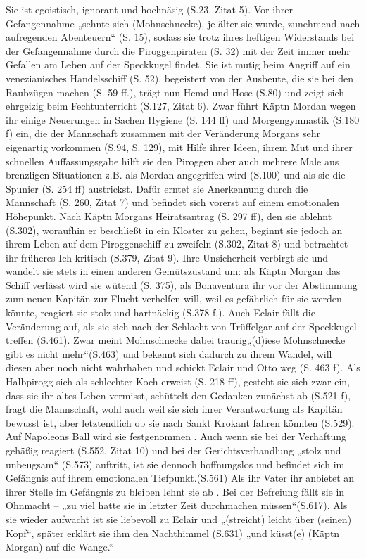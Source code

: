Sie ist egoistisch, ignorant und hochnäsig (S.23, Zitat 5). 
Vor ihrer Gefangennahme „sehnte sich (Mohnschnecke), 
je älter sie wurde, zunehmend nach aufregenden Abenteuern“ (S. 15), sodass sie trotz ihres heftigen Widerstands 
bei der Gefangennahme durch die Piroggenpiraten (S. 32) mit der Zeit immer mehr Gefallen am Leben auf der Speckkugel 
findet. Sie ist mutig beim Angriff auf ein venezianisches Handelsschiff (S. 52),  begeistert von der Ausbeute, die sie 
bei den Raubzügen machen (S. 59 ff.), trägt nun Hemd und Hose (S.80) und zeigt sich ehrgeizig beim Fechtunterricht 
(S.127, Zitat 6). Zwar führt Käptn Mordan wegen ihr einige Neuerungen in Sachen Hygiene (S. 144 ff) und 
Morgengymnastik (S.180 f) ein, die der Mannschaft  zusammen mit der Veränderung Morgans sehr eigenartig 
vorkommen (S.94, S. 129), mit Hilfe ihrer Ideen, ihrem Mut und ihrer schnellen Auffassungsgabe  hilft sie 
den Piroggen aber auch mehrere Male aus brenzligen Situationen z.B. als Mordan angegriffen wird (S.100) und 
als sie die Spunier (S. 254 ff) austrickst. Dafür erntet sie Anerkennung durch die Mannschaft (S. 260, Zitat 7) 
und befindet sich vorerst auf einem emotionalen Höhepunkt.  Nach  Käptn Morgans Heiratsantrag (S. 297 ff), den sie 
ablehnt (S.302), woraufhin er beschließt in ein Kloster zu gehen, beginnt sie jedoch an ihrem Leben auf dem 
Piroggenschiff zu zweifeln (S.302, Zitat 8) und betrachtet ihr früheres Ich kritisch (S.379, Zitat 9). Ihre 
Unsicherheit verbirgt sie und  wandelt sie stets in einen anderen Gemütszustand um: als Käptn Morgan das Schiff 
verlässt wird sie wütend (S. 375), als Bonaventura ihr vor der Abstimmung zum neuen Kapitän zur Flucht verhelfen 
will, weil es gefährlich für sie werden könnte, reagiert sie stolz und hartnäckig (S.378 f.). Auch Eclair fällt 
die Veränderung auf, als sie sich nach der Schlacht von Trüffelgar auf der Speckkugel treffen (S.461). Zwar meint 
Mohnschnecke dabei traurig„(d)iese Mohnschnecke gibt es nicht mehr“(S.463) und bekennt sich dadurch zu ihrem Wandel, 
will diesen aber noch nicht wahrhaben und schickt Eclair und Otto weg (S. 463 f). Als Halbpirogg sich als schlechter 
Koch erweist (S. 218 ff), gesteht sie sich zwar ein, dass sie ihr altes Leben vermisst, schüttelt den Gedanken 
zunächst ab (S.521 f), fragt die Mannschaft, wohl auch weil sie sich ihrer Verantwortung als Kapitän bewusst ist, 
aber letztendlich ob sie nach Sankt Krokant fahren könnten (S.529). Auf Napoleons Ball wird sie festgenommen \cite[S.551]{pir}. 
Auch wenn sie bei der Verhaftung gehäßig reagiert (S.552, Zitat 10) und bei der Gerichtsverhandlung „stolz und 
unbeugsam“ (S.573) auftritt, ist sie dennoch hoffnungslos und befindet sich im Gefängnis auf ihrem emotionalen 
Tiefpunkt.(S.561) Als ihr Vater ihr anbietet an ihrer Stelle im Gefängnis zu bleiben lehnt sie ab \cite[S.562]{pir}. Bei der Befreiung fällt sie in Ohnmacht – „zu viel hatte sie in letzter Zeit durchmachen müssen“(S.617). Als sie wieder aufwacht ist sie liebevoll zu Eclair und „(streicht) leicht über (seinen) Kopf“, später erklärt sie ihm den Nachthimmel (S.631) „und küsst(e) (Käptn Morgan) auf die Wange.“



